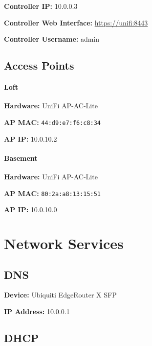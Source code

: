 \documentclass[]{article}
\let\oldparagraph\paragraph
\renewcommand{\paragraph}[1]{\oldparagraph{#1}\mbox{}}
\begin{document}
\textbf{Controller IP: }
{10.0.0.3}

\textbf{Controller Web Interface: }
{\href{https://www.google.com/url?q=https://unifi:8443\&sa=D\&ust=1544293199842000}{https://unifi:8443}}

\textbf{Controller Username: }
{admin}

\subsection{\texorpdfstring{{Access Points}}{Access Points}}

\paragraph{\texorpdfstring{{Loft}}{Loft}}

\textbf{Hardware: }
{UniFi AP-AC-Lite}

\textbf{AP MAC: }
\texttt{44:d9:e7:f6:c8:34}

\textbf{AP IP: }
{10.0.10.2}

\paragraph{\texorpdfstring{{Basement}}{Basement}}

\textbf{Hardware: }
{UniFi AP-AC-Lite}

\textbf{AP MAC: }
\texttt{80:2a:a8:13:15:51}

\textbf{AP IP: }
{10.0.10.0}


\newpage

\vspace{\baselineskip}\section*{Network Services}

\subsection{\texorpdfstring{{DNS}}{DNS}}

\textbf{Device: }
{Ubiquiti EdgeRouter X SFP}

\textbf{IP Address: }
{10.0.0.1}

\subsection{\texorpdfstring{{DHCP}}{DHCP}}
\end{document}
